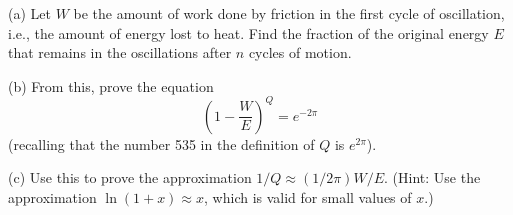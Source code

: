 (a) Let $W$ be the amount of work done by friction in the first
cycle of oscillation, i.e., the amount of energy lost to
heat. Find the fraction of the original energy $E$ that
remains in the oscillations after $n$ cycles of motion.

(b) From this, prove the equation
\begin{equation*}
  \left(1-\frac{W}{E}\right)^Q = e^{-2\pi}
\end{equation*}
(recalling that the number
535 in the definition of $Q$ is $e^{2\pi}$).

(c) Use this to prove the approximation $1/Q\approx(1/2\pi )W/E$.
(Hint: Use the approximation $\ln (1+x)\approx x$, which is valid
for small values of $x$.)
